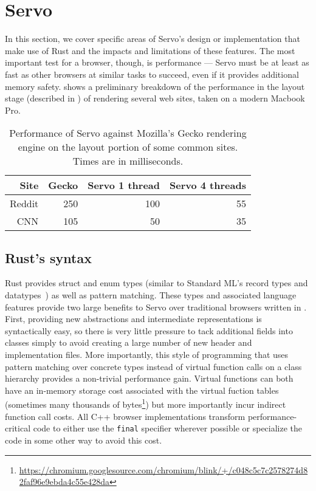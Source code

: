 \section{Servo}
\label{sec:servo}
In this section, we cover specific areas of Servo's design or implementation that make use of Rust
and the impacts and limitations of these features.
The most important test for a browser, though, is performance --- Servo must be at least as fast
as other browsers at similar tasks to succeed, even if it provides additional memory safety.
 shows a preliminary breakdown of the performance in the layout stage (described
in ) of rendering several web sites, taken on a modern Macbook Pro.
\begin{table}
  \begin{center}
    \begin{tabular}{r || r | r | r}
      Site & Gecko & Servo 1 thread & Servo 4 threads \\
      \hline
      Reddit & 250 & 100 & 55  \\
      CNN & 105 & 50 & 35 \\
    \end{tabular}%
  \end{center}%
  \caption{Performance of Servo against Mozilla's Gecko rendering engine on the layout portion of some common sites.
  Times are in milliseconds.}
  \label{servo-perf}
\end{table}

\subsection{Rust's syntax}
Rust provides struct and enum types (similar to Standard ML's record types and datatypes~\cite{sml97-definition}) as
well as pattern matching.
These types and associated language features provide two large benefits to Servo over traditional browsers
written in \Cplusplus{}.
First, providing new abstractions and intermediate representations is syntactically easy, so there is very little
pressure to tack additional fields into classes simply to avoid creating a large number of new header and implementation
files.
More importantly, this style of programming that uses pattern matching over concrete types instead of
virtual function calls on a class hierarchy provides a non-trivial performance gain.
Virtual functions can both have an in-memory storage cost associated with the virtual fuction tables (sometimes many thousands of bytes\footnote{\url{https://chromium.googlesource.com/chromium/blink/+/c048c5c7c2578274d82faf96e9ebda4c55e428da}}) but more importantly
incur indirect function call costs.
All C++ browser implementations transform performance-critical code to either use the \lstinline[language=C]{final}
specifier wherever possible or specialize the code in some other way to avoid this cost.

